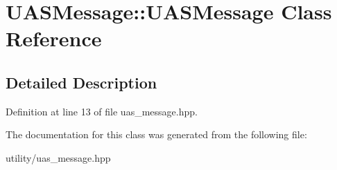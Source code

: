 \hypertarget{class_u_a_s_message_1_1_u_a_s_message}{}\section{U\+A\+S\+Message\+:\+:U\+A\+S\+Message Class Reference}
\label{class_u_a_s_message_1_1_u_a_s_message}


\subsection{Detailed Description}


Definition at line 13 of file uas\+\_\+message.\+hpp.



The documentation for this class was generated from the following file\+:\begin{DoxyCompactItemize}
\item 
utility/uas\+\_\+message.\+hpp\end{DoxyCompactItemize}
